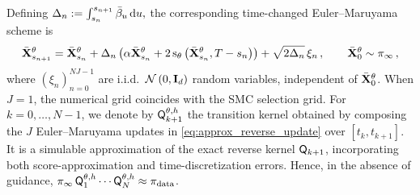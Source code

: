\documentclass[11pt]{article}
\theoremstyle{plain}
\theoremstyle{definition}
\theoremstyle{remark}
\begin{document}
Defining
$
\Delta_n:=\int_{s_n}^{s_{n+1}}\bar{\beta}_{u}\,\mathrm{d} u ,
$
the corresponding time-changed Euler--Maruyama scheme is
\begin{equation}
\label{eq:approx_reverse_update}
\Xbar_{s_{n+1}}^\theta
=
\Xbar_{s_n}^\theta + \Delta_n \left( \isvp\Xbar_{s_n}^\theta + 2\scorenet[T-s_n][\Xbar_{s_n}^\theta][\theta] \right) + \sqrt{2\Delta_n}\,\xi_n \eqsp, \qquad \Xbar_0^\theta \sim \refmeas \eqsp,
\end{equation}
where $(\xi_n)_{n=0}^{NJ-1}$ are i.i.d.\ $\gaussiand{0}{\Id_\xdim}$ random variables, independent of $\bar{\mathbf{X}}_0^\theta$. When $J=1$, the numerical grid coincides with the
SMC selection grid.
For $k=0,\ldots,N-1$, we denote by $\mk{k+1}[\theta,h]$ the transition kernel obtained by composing the
$J$ Euler--Maruyama updates in \eqref{eq:approx_reverse_update} over
$[t_k,t_{k+1}]$. It is a simulable approximation of the exact reverse
kernel $\mk{k+1}$, incorporating both score-approximation and
time-discretization errors. Hence, in the absence of guidance, $\refmeas\,\mk{1}[\theta,h]\cdots\mk{N}[\theta,h] \approx \pidata$.




\end{document}
